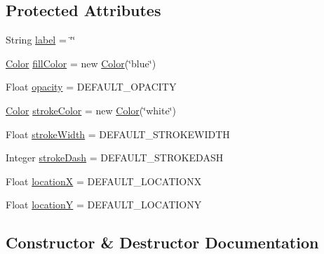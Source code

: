 \subsection*{Protected Attributes}
\begin{DoxyCompactItemize}
\item 
String \mbox{\hyperlink{classbridges_1_1base_1_1_symbol_ad2adcc82e6a96c2f3c465702502655e9}{label}} = \char`\"{}\char`\"{}
\item 
\mbox{\hyperlink{classbridges_1_1base_1_1_color}{Color}} \mbox{\hyperlink{classbridges_1_1base_1_1_symbol_a44f00712b6c584c7778ed9de4c394cbf}{fill\+Color}} = new \mbox{\hyperlink{classbridges_1_1base_1_1_color}{Color}}(\char`\"{}blue\char`\"{})
\item 
Float \mbox{\hyperlink{classbridges_1_1base_1_1_symbol_a7a01e5219d556a24e923885fe1646abb}{opacity}} = D\+E\+F\+A\+U\+L\+T\+\_\+\+O\+P\+A\+C\+I\+TY
\item 
\mbox{\hyperlink{classbridges_1_1base_1_1_color}{Color}} \mbox{\hyperlink{classbridges_1_1base_1_1_symbol_a51a9a36983b00156284d86ca80cccfb0}{stroke\+Color}} = new \mbox{\hyperlink{classbridges_1_1base_1_1_color}{Color}}(\char`\"{}white\char`\"{})
\item 
Float \mbox{\hyperlink{classbridges_1_1base_1_1_symbol_a9f90a6efb9cb7a2f4e38c46862ae5a95}{stroke\+Width}} = D\+E\+F\+A\+U\+L\+T\+\_\+\+S\+T\+R\+O\+K\+E\+W\+I\+D\+TH
\item 
Integer \mbox{\hyperlink{classbridges_1_1base_1_1_symbol_a04134e835474c4747e334389f00513c0}{stroke\+Dash}} = D\+E\+F\+A\+U\+L\+T\+\_\+\+S\+T\+R\+O\+K\+E\+D\+A\+SH
\item 
Float \mbox{\hyperlink{classbridges_1_1base_1_1_symbol_af3bf62ef04db518c6de7876bfa5ad5f9}{locationX}} = D\+E\+F\+A\+U\+L\+T\+\_\+\+L\+O\+C\+A\+T\+I\+O\+NX
\item 
Float \mbox{\hyperlink{classbridges_1_1base_1_1_symbol_a130677ce61d8d23f0ffe48c291354d5b}{locationY}} = D\+E\+F\+A\+U\+L\+T\+\_\+\+L\+O\+C\+A\+T\+I\+O\+NY
\end{DoxyCompactItemize}


\subsection{Constructor \& Destructor Documentation}
\mbox{\label{classbridges_1_1base_1_1_symbol_a5449cffb7ffdbab093a110957158acc6}} 
